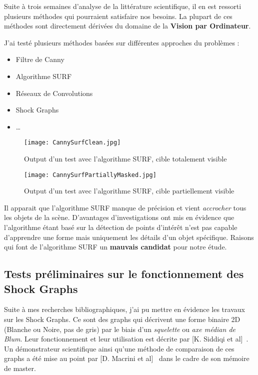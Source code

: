 Suite à trois semaines d'analyse de la littérature scientifique, il en est ressorti plusieurs méthodes qui pourraient satisfaire nos besoins. La plupart de ces méthodes sont directement dérivées du domaine de la \textbf{Vision par Ordinateur}.

J'ai testé plusieurs méthodes basées sur différentes approches du problèmes :
\begin{itemize}
	\item Filtre de Canny
	\item Algorithme SURF
	\item Réseaux de Convolutions
	\item Shock Graphs
	\item \ldots
\end{itemize}
\vspace{3mm}

\begin{figure}[H]
    \centering
    \texttt{[image: CannySurfClean.jpg]}
	\caption{Output d'un test avec l'algorithme SURF, cible totalement visible} 
\end{figure}
\vspace{-6mm}

\begin{figure}[H]
    \centering
    \texttt{[image: CannySurfPartiallyMasked.jpg]}
	\caption{Output d'un test avec l'algorithme SURF, cible partiellement visible}\label{image.CannySurfPartiallyMasked} 
\end{figure}
\vspace{-6mm}

Il apparait que l'algorithme SURF manque de précision et vient \textit{accrocher} tous les objets de la scène. D'avantages d'investigations ont mis en évidence que l'algorithme étant basé sur la détection de points d'intérêt n'est pas capable d'apprendre une forme mais uniquement les détails d'un objet spécifique. Raisons qui font de l'algorithme SURF un \textbf{mauvais candidat} pour notre étude.

\clearpage
\subsection{Tests préliminaires sur le fonctionnement des Shock Graphs}

Suite à mes recherches bibliographiques, j'ai pu mettre en évidence les travaux sur les Shock Graphs. Ce sont des graphs qui décrivent une forme binaire 2D (Blanche ou Noire, pas de gris) par le biais d'un \textit{squelette} ou \textit{axe médian de Blum}. Leur fonctionnement et leur utilisation est décrite par [K. Siddiqi et al]~\cite{Siddiqi1999}. Un démonstrateur scientifique ainsi qu'une méthode de comparaison de ces graphs a été mise au point par [D. Macrini et al]~\cite{Macrini2002} dans le cadre de son mémoire de master.

